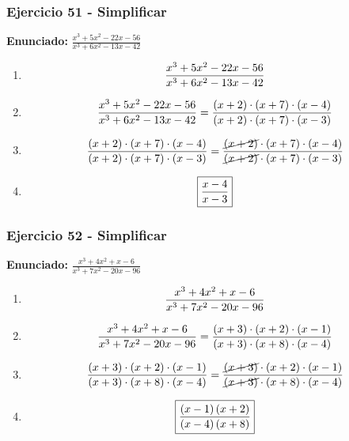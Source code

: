 \documentclass[11pt,a4paper]{article}
\newcommand{\fitmath}[1]{%
\[
\setbox0=\hbox{$\displaystyle #1$}%
\ifdim\wd0>\linewidth
\resizebox{\linewidth}{!}{$\displaystyle #1$}%
\else
#1%
\fi
\]
}
\begin{document}
\vspace{0.12cm}
\subsubsection*{Ejercicio 51 - Simplificar}
\textbf{Enunciado:} $ \frac{x^{3} + 5 x^{2} - 22 x - 56}{x^{3} + 6 x^{2} - 13 x - 42} $\par
\begin{enumerate}[leftmargin=2em]
\item \fitmath{\frac{x^{3} + 5 x^{2} - 22 x - 56}{x^{3} + 6 x^{2} - 13 x - 42}}
\item \fitmath{\frac{x^{3} + 5 x^{2} - 22 x - 56}{x^{3} + 6 x^{2} - 13 x - 42}=\frac{\left(x + 2\right)\cdot \left(x + 7\right)\cdot \left(x - 4\right)}{\left(x + 2\right)\cdot \left(x + 7\right)\cdot \left(x - 3\right)}}
\item \fitmath{\frac{\left(x + 2\right)\cdot \left(x + 7\right)\cdot \left(x - 4\right)}{\left(x + 2\right)\cdot \left(x + 7\right)\cdot \left(x - 3\right)}=\frac{\cancel{\left(x + 2\right)}\cdot \left(x + 7\right)\cdot \left(x - 4\right)}{\cancel{\left(x + 2\right)}\cdot \left(x + 7\right)\cdot \left(x - 3\right)}}
\item \fitmath{\boxed{\frac{x - 4}{x - 3}}}
\end{enumerate}

\vspace{0.12cm}
\subsubsection*{Ejercicio 52 - Simplificar}
\textbf{Enunciado:} $ \frac{x^{3} + 4 x^{2} + x - 6}{x^{3} + 7 x^{2} - 20 x - 96} $\par
\begin{enumerate}[leftmargin=2em]
\item \fitmath{\frac{x^{3} + 4 x^{2} + x - 6}{x^{3} + 7 x^{2} - 20 x - 96}}
\item \fitmath{\frac{x^{3} + 4 x^{2} + x - 6}{x^{3} + 7 x^{2} - 20 x - 96}=\frac{\left(x + 3\right)\cdot \left(x + 2\right)\cdot \left(x - 1\right)}{\left(x + 3\right)\cdot \left(x + 8\right)\cdot \left(x - 4\right)}}
\item \fitmath{\frac{\left(x + 3\right)\cdot \left(x + 2\right)\cdot \left(x - 1\right)}{\left(x + 3\right)\cdot \left(x + 8\right)\cdot \left(x - 4\right)}=\frac{\cancel{\left(x + 3\right)}\cdot \left(x + 2\right)\cdot \left(x - 1\right)}{\cancel{\left(x + 3\right)}\cdot \left(x + 8\right)\cdot \left(x - 4\right)}}
\item \fitmath{\boxed{\frac{\left(x - 1\right) \left(x + 2\right)}{\left(x - 4\right) \left(x + 8\right)}}}
\end{enumerate}
\end{document}
